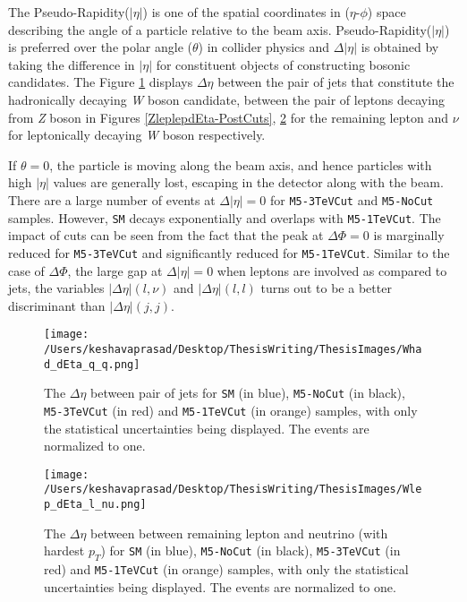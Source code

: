 The Pseudo-Rapidity($|\eta|$) is one of the spatial coordinates in ($\eta$-$\phi$) space describing the angle of a particle relative to the beam axis. Pseudo-Rapidity($|\eta|$) is preferred over the polar angle ($\theta$) in collider physics and $\Delta|\eta|$ is obtained by taking the difference in $|\eta|$ for constituent objects of constructing bosonic candidates. The Figure \ref{Whad-dEta-PostCuts} displays $\Delta\eta$ between the pair of jets that constitute the hadronically decaying \textit{W} boson candidate, between the pair of leptons decaying from \textit{Z} boson in Figures \ref{ZleplepdEta-PostCuts}, \ref{WLep-dEta-PostCuts} for the remaining lepton and $\nu$ for leptonically decaying \textit{W} boson respectively.

If $\theta=0$, the particle is moving along the beam axis, and hence particles with high $|\eta|$ values are generally lost, escaping in the detector along with the beam. There are a large number of events at $\Delta|\eta|=0$ for \texttt{M5-3TeVCut} and \texttt{M5-NoCut} samples. However, \texttt{SM} decays exponentially and overlaps with \texttt{M5-1TeVCut}. The impact of cuts can be seen from the fact that the peak at $\Delta\Phi=0$ is marginally reduced for \texttt{M5-3TeVCut} and significantly reduced for \texttt{M5-1TeVCut}. Similar to the case of $\Delta\Phi$, the large gap at $\Delta|\eta|=0$ when leptons are involved as compared to jets, the variables $|\Delta\eta|(l,\nu)$ and $|\Delta\eta|(l,l)$ turns out to be a better discriminant than $|\Delta\eta|(j,j)$.


\begin{figure}[!htb]%
\centering
\texttt{[image: /Users/keshavaprasad/Desktop/ThesisWriting/ThesisImages/Whad\_dEta\_q\_q.png]}
\caption{The $\Delta\eta$ between pair of jets for \texttt{SM} (in blue), \texttt{M5-NoCut} (in black), \texttt{M5-3TeVCut} (in red) and \texttt{M5-1TeVCut} (in orange) samples, with only the statistical uncertainties being displayed. The events are normalized to one.}
\label{Whad-dEta-PostCuts}
\end{figure}

\begin{figure}[!htb]%
	\centering
	\texttt{[image: /Users/keshavaprasad/Desktop/ThesisWriting/ThesisImages/Wlep\_dEta\_l\_nu.png]}
	\caption{The $\Delta\eta$ between between remaining lepton and neutrino (with hardest $p_{T}$) for \texttt{SM} (in blue), \texttt{M5-NoCut} (in black), \texttt{M5-3TeVCut} (in red) and \texttt{M5-1TeVCut} (in orange) samples, with only the statistical uncertainties being displayed. The events are normalized to one.}
	\label{WLep-dEta-PostCuts}
\end{figure}

